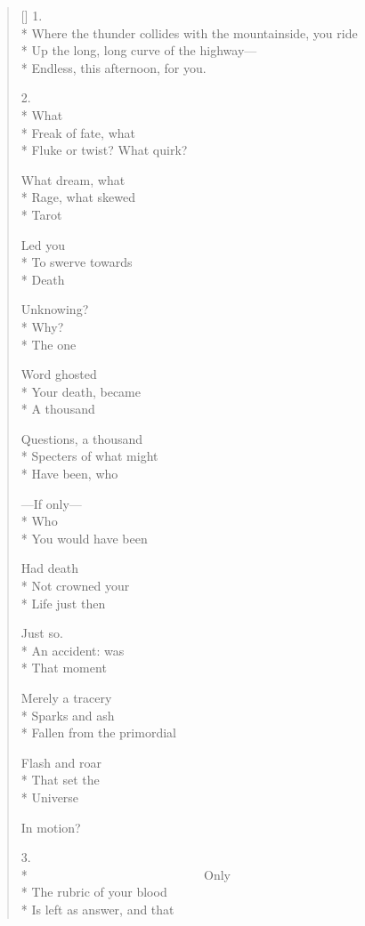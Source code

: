 \label{ch:siderius_nuncius}
\settowidth{\versewidth}{Where the thunder collides with the mountainside, you ride}
\begin{verse}[\versewidth]
1.\\*
Where the thunder collides with the mountainside, you ride\\*
Up the long, long curve of the highway---\\*
Endless, this afternoon, for you.

2.\\*
What\\*
Freak of fate, what\\*
Fluke or twist? What quirk?

What dream, what\\*
Rage, what skewed\\*
Tarot

Led you\\*
To swerve towards\\*
Death

Unknowing?\\*
Why?\\*
The one

Word ghosted\\*
Your death, became\\*
A thousand

Questions, a thousand\\*
Specters of what might\\*
Have been, who

---If only---\\*
Who\\*
You would have been

Had death\\*
Not crowned your\\*
Life just then

Just so.\\*
An accident: was\\*
That moment

Merely a tracery\\*
Sparks and ash\\*
Fallen from the primordial

Flash and roar\\*
That set the\\*
Universe

In motion?

3.\\*
                                 Only\\*
The rubric of your blood\\*
Is left as answer, and that


\end{verse}
